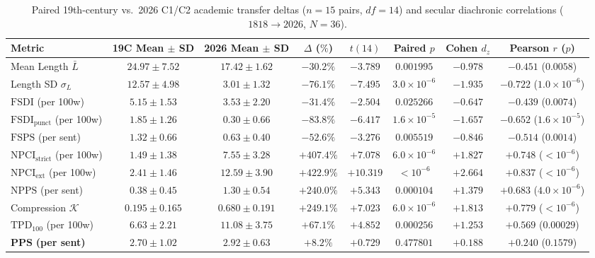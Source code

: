 \documentclass[11pt,reqno]{article}
\begin{document}
\begin{table}[ht]
\centering
\caption{Paired 19th-century vs.\ 2026 C1/C2 academic transfer deltas ($n=15$ pairs, $df=14$) and secular diachronic correlations ($1818\to 2026$, $N=36$).}\label{tab:paired}
\smallskip
\begin{tabular}{@{}lccccccc@{}}
\toprule
Metric & 19C Mean $\pm$ SD & 2026 Mean $\pm$ SD & $\Delta$ ($\%$) & $t(14)$ & Paired $p$ & Cohen $d_z$ & Pearson $r$ ($p$) \\
\midrule
Mean Length $\bar{L}$ & $24.97 \pm 7.52$ & $17.42 \pm 1.62$ & $-30.2\%$ & $-3.789$ & $0.001995$ & $-0.978$ & $-0.451$ ($0.0058$) \\
Length SD $\sigma_L$ & $12.57 \pm 4.98$ & $3.01 \pm 1.32$ & $-76.1\%$ & $-7.495$ & $3.0\times 10^{-6}$ & $-1.935$ & $-0.722$ ($1.0\times 10^{-6}$) \\
$\mathrm{FSDI}$ (per 100w) & $5.15 \pm 1.53$ & $3.53 \pm 2.20$ & $-31.4\%$ & $-2.504$ & $0.025266$ & $-0.647$ & $-0.439$ ($0.0074$) \\
$\mathrm{FSDI}_{\mathrm{punct}}$ (per 100w) & $1.85 \pm 1.26$ & $0.30 \pm 0.66$ & $-83.8\%$ & $-6.417$ & $1.6\times 10^{-5}$ & $-1.657$ & $-0.652$ ($1.6\times 10^{-5}$) \\
$\mathrm{FSPS}$ (per sent) & $1.32 \pm 0.66$ & $0.63 \pm 0.40$ & $-52.6\%$ & $-3.276$ & $0.005519$ & $-0.846$ & $-0.514$ ($0.0014$) \\
$\mathrm{NPCI}_{\mathrm{strict}}$ (per 100w) & $1.49 \pm 1.38$ & $7.55 \pm 3.28$ & $+407.4\%$ & $+7.078$ & $6.0\times 10^{-6}$ & $+1.827$ & $+0.748$ ($<10^{-6}$) \\
$\mathrm{NPCI}_{\mathrm{ext}}$ (per 100w) & $2.41 \pm 1.46$ & $12.59 \pm 3.90$ & $+422.9\%$ & $+10.319$ & $<10^{-6}$ & $+2.664$ & $+0.837$ ($<10^{-6}$) \\
$\mathrm{NPPS}$ (per sent) & $0.38 \pm 0.45$ & $1.30 \pm 0.54$ & $+240.0\%$ & $+5.343$ & $0.000104$ & $+1.379$ & $+0.683$ ($4.0\times 10^{-6}$) \\
Compression $\mathcal{K}$ & $0.195 \pm 0.165$ & $0.680 \pm 0.191$ & $+249.1\%$ & $+7.023$ & $6.0\times 10^{-6}$ & $+1.813$ & $+0.779$ ($<10^{-6}$) \\
$\mathrm{TPD}_{100}$ (per 100w) & $6.63 \pm 2.21$ & $11.08 \pm 3.75$ & $+67.1\%$ & $+4.852$ & $0.000256$ & $+1.253$ & $+0.569$ ($0.00029$) \\
$\mathbf{PPS}$ \textbf{(per sent)} & $\mathbf{2.70 \pm 1.02}$ & $\mathbf{2.92 \pm 0.63}$ & $\mathbf{+8.2\%}$ & $\mathbf{+0.729}$ & $\mathbf{0.477801}$ & $\mathbf{+0.188}$ & $\mathbf{+0.240}$ ($\mathbf{0.1579}$) \\
\bottomrule
\end{tabular}
\end{table}
\end{document}
